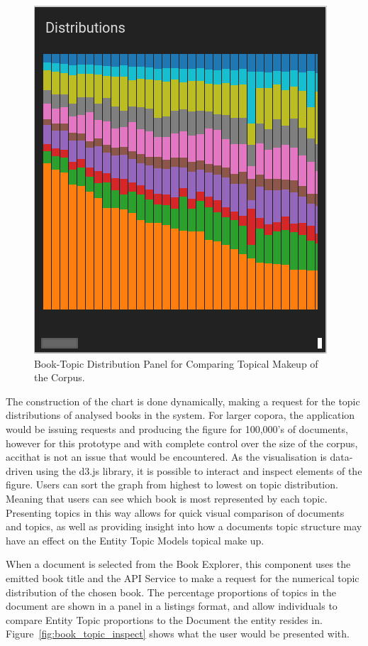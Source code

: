\documentclass[10pt]{report}
\begin{document}
\begin{figure}[h!]
  \centering
  \includegraphics[scale=0.5]{topic_distr}
  \caption{Book-Topic Distribution Panel for Comparing Topical Makeup of the Corpus. \label{fig:book_topic_compare}}
\end{figure}

The construction of the chart is done dynamically, making a request for the topic distributions of analysed books in the system. For larger copora, the application would be issuing requests and producing the figure for 100,000's of documents, however for this prototype and with complete control over the size of the corpus, accithat is not an issue that would be encountered. As the visualisation is data-driven using the d3.js library, it is possible to interact and inspect elements of the figure. Users can sort the graph from highest to lowest on topic distribution. Meaning that users can see which book is most represented by each topic. Presenting topics in this way allows for quick visual comparison of documents and topics, as well as providing insight into how a documents topic structure may have an effect on the Entity Topic Models topical make up. 

When a document is selected from the Book Explorer, this component uses the emitted book title and the API Service to make a request for the numerical topic distribution of the chosen book. The percentage proportions of topics in the document are shown in a panel in a listings format, and allow individuals to compare Entity Topic proportions to the Document the entity resides in. Figure~\ref{fig:book_topic_inspect} shows what the user would be presented with.
\end{document}

